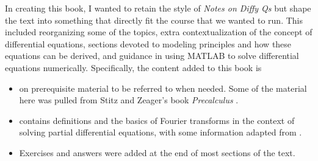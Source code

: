 \documentclass{ximera}
\begin{document}
In creating this book, I wanted to retain the style of \emph{Notes on Diffy Qs} \cite{JL} but shape the text into something that directly fit the course that we wanted to run. This included reorganizing some of the topics, extra contextualization of the concept of differential equations, sections devoted to modeling principles and how these equations can be derived, and guidance in using MATLAB to solve differential equations numerically. Specifically, the content added to this book is
\begin{itemize}
    \item {} on prerequisite material to be referred to when needed. Some of the material here was pulled from Stitz and Zeager's book \emph{Precalculus} \cite{SZ}.
    \item {} contains definitions and the basics of Fourier transforms in the context of solving partial differential equations, with some information adapted from \cite{ZW}.  
    \item Exercises and answers were added at the end of most sections of the text.
\end{itemize}

\end{document}
